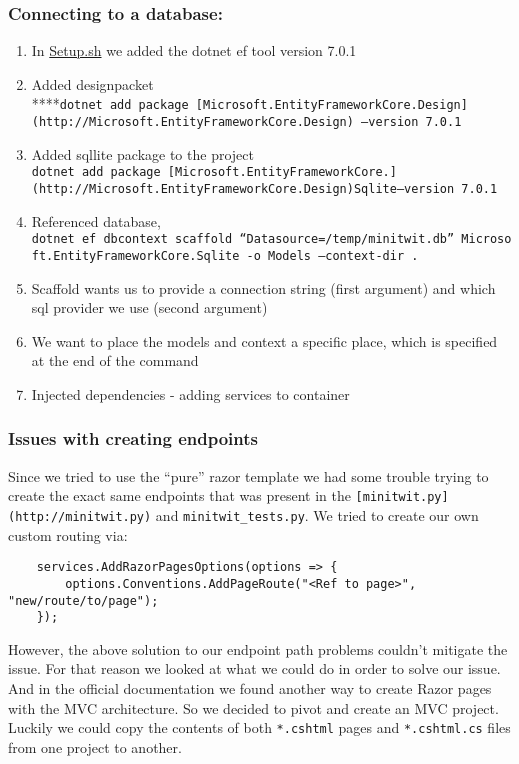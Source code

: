 \subsubsection{Connecting to a
database:}
\label{log:connecting-to-a-database}

\begin{enumerate}
    \item In \href{http://Setup.sh}{Setup.sh} we added the dotnet ef tool version 7.0.1
    \item Added designpacket ****\texttt{dotnet\ add\ package\ {[}Microsoft.EntityFrameworkCore.Design{]}(http://Microsoft.EntityFrameworkCore.Design)\ —version\ 7.0.1}
    \item Added sqllite package to the project \texttt{dotnet\ add\ package\ {[}Microsoft.EntityFrameworkCore.{]}(http://Microsoft.EntityFrameworkCore.Design)Sqlite—version\ 7.0.1}
    \item Referenced database, \texttt{dotnet\ ef\ dbcontext\ scaffold\ “Datasource=/temp/minitwit.db”\ Microsoft.EntityFrameworkCore.Sqlite\ -o\ Models\ —context-dir\ .}
    \item Scaffold wants us to provide a connection string (first argument) and which sql provider we use (second argument)
    \item We want to place the models and context a specific place, which is specified at the end of the command
    \item Injected dependencies - adding services to container
\end{enumerate}

\subsubsection{Issues with creating
endpoints}
\label{log:issues-with-creating-endpoints}

Since we tried to use the ``pure'' razor template we had some trouble trying to create the exact same endpoints that was present in the \texttt{{[}minitwit.py{]}(http://minitwit.py)} and \texttt{minitwit\_tests.py}. We tried to create our own custom routing via:

\begin{verbatim}
    services.AddRazorPagesOptions(options => {
        options.Conventions.AddPageRoute("<Ref to page>", "new/route/to/page");
    });
\end{verbatim}

However, the above solution to our endpoint path problems couldn't mitigate the issue. For that reason we looked at what we could do in order to solve our issue. And in the official documentation we found another way to create Razor pages with the MVC architecture. So we decided to pivot and create an MVC project. Luckily we could copy the contents of both \texttt{*.cshtml} pages and \texttt{*.cshtml.cs} files from one project to another.

